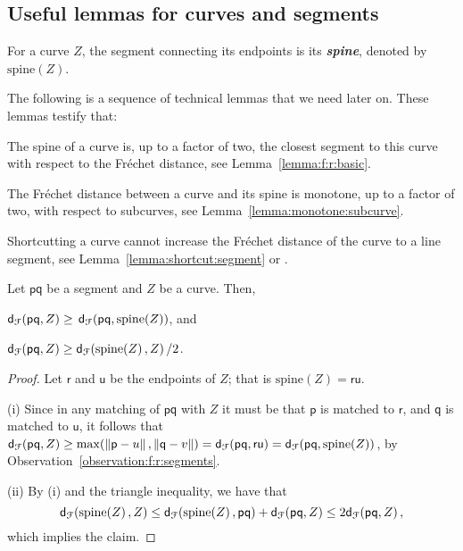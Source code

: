 \documentclass[12pt]{article}
\newcommand{\seclab}[1]{\label{sec:#1}}
\newcommand{\lemlab}[1]{\label{lemma:#1}}
\newcommand{\lemref}[1]{Lemma~\ref{lemma:#1}}
\newcommand{\deflab}[1]{\label{def:#1}}
\newcommand{\obsref}[1]{Observation~\ref{observation:#1}}
\newcommand{\itemlab}[1]{\label{item:#1}}
\newcommand{\emphic}[2]{\textcolor{blue25}{\textbf{\emph{#1}}}\index{#2}}
\newcommand{\emphi}[1]{\emphic{#1}{#1}}
\newcommand{\Frechet}{Fr\'{e}c{h}e{}t\xspace}\providecommand{\Arr}{\mathop{\mathrm{\EuScript{A}}}}
\newcommand{\distFr}[2]{\mathsf{d}_{\EuScript{F}}\pth{#1, #2}}
\newcommand{\distX}[2]{\distCmd{#1 - #2}}
\newcommand{\pnt}{\mathsf{p}}
\newcommand{\pntA}{\mathsf{q}}
\newcommand{\pntB}{\mathsf{r}}
\newcommand{\pntC}{\mathsf{u}}
\newcommand{\cZ}{{Z}}
\providecommand{\pth}[2][\!]{#1\left({#2}\right)}
\newcommand{\spineX}[1]{\mathrm{s{}p{}i{}n{}e}\pth{#1}}
\numberwithin{figure}{section}
\numberwithin{equation}{section}
\newcommand{\matching}{matching\xspace}
\begin{document}
\subsection{Useful lemmas for curves and segments}
\seclab{query:helper}

\begin{defn}\deflab{spine}
    For a curve $\cZ$, the segment connecting its endpoints is its
    \emphi{spine}, denoted by $\spineX{\cZ}$.
\end{defn}

The following is a sequence of technical lemmas that we need later
on. These lemmas testify that:
\begin{compactenum}[\quad (A)]
    \item The spine of a curve is, up to a factor of two, the closest
    segment to this curve with respect to the \Frechet distance, see
    \lemref{f:r:basic}.
    
    \item The \Frechet distance between a curve and its spine is
    monotone, up to a factor of two, with respect to subcurves, see
    \lemref{monotone:subcurve}.
    
    \item Shortcutting a curve cannot increase the \Frechet distance
    of the curve to a line segment, see \lemref{shortcut:segment} or
    \cite{bbw-cfdsp-08}.
\end{compactenum}

\begin{lemma}\lemlab{f:r:basic}Let $\pnt \pntA$ be a segment and $\cZ$ be a curve.  Then,
    \begin{inparaenum}[(i)]
        \item \itemlab{shortcut} $\distFr{\pnt \pntA}{\cZ} \geq$
        $\distFr{\pnt \pntA}{\spineX{\cZ}}$, and
        \item $\distFr{\pnt \pntA}{\cZ} \geq
        \distFr{\spineX{\cZ}}{\cZ}/2$.
    \end{inparaenum}
\end{lemma}

\begin{proof}
    Let $\pntB$ and $\pntC$ be the endpoints of $\cZ$; that is
    $\spineX{\cZ} = \pntB \pntC$.
    
    (i) Since in any \matching{} of $\pnt \pntA$ with $\cZ$ it must be
    that $\pnt$ is matched to $\pntB$, and $\pntA$ is matched to
    $\pntC$, it follows that $\distFr{\pnt \pntA}{\cZ} \geq \max (
    \distX{\pnt}{u}, \distX{\pntA}{v}) = \distFr{\pnt \pntA}{\pntB
       \pntC} = \distFr{\pnt \pntA}{\spineX{\cZ}}$, by
    \obsref{f:r:segments}.
    
    (ii) By (i) and the triangle inequality, we have that
    \[\distFr{\spineX{\cZ}}{\cZ} \leq \distFr{\spineX{\cZ}}{\pnt
       \pntA} + \distFr{\pnt \pntA}{\cZ} \leq 2 \distFr{\pnt
       \pntA}{\cZ},\] which implies the claim.
\end{proof}
\end{document}
